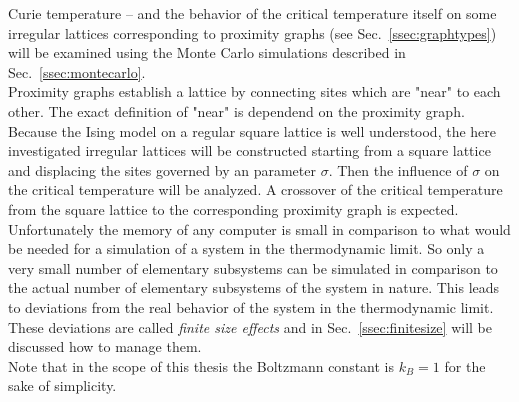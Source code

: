 Curie temperature -- and the behavior of the critical temperature itself
on some irregular lattices corresponding to proximity graphs
(see Sec.\ \ref{ssec:graphtypes}) will be examined using the Monte
Carlo simulations described in Sec.\ \ref{ssec:montecarlo}.\\
Proximity graphs establish a lattice by connecting sites which are "near"
to each other. The exact definition of "near" is dependend on the proximity
graph.\\
Because the Ising model on a regular square lattice is well understood,
the here investigated irregular lattices will be constructed starting from
a square lattice and displacing the sites governed by an parameter \(\sigma\).
Then the influence of \(\sigma\) on the critical temperature will be
analyzed. A crossover of the critical temperature from the square lattice
to the corresponding proximity graph is expected.\\

Unfortunately the memory of any computer is small in comparison to what
would be needed for a simulation of a system in the
thermodynamic limit. So only a very small number of elementary subsystems can be
simulated in comparison to the actual number of elementary subsystems
of the system in nature. This leads to deviations from the real behavior
of the system in the thermodynamic limit. These deviations are called
\emph{finite size effects} and in Sec.\ \ref{ssec:finitesize} will be
discussed how to manage them.\\

Note that in the scope of this thesis the Boltzmann constant is \(k_{B}=1\)
for the sake of simplicity.


